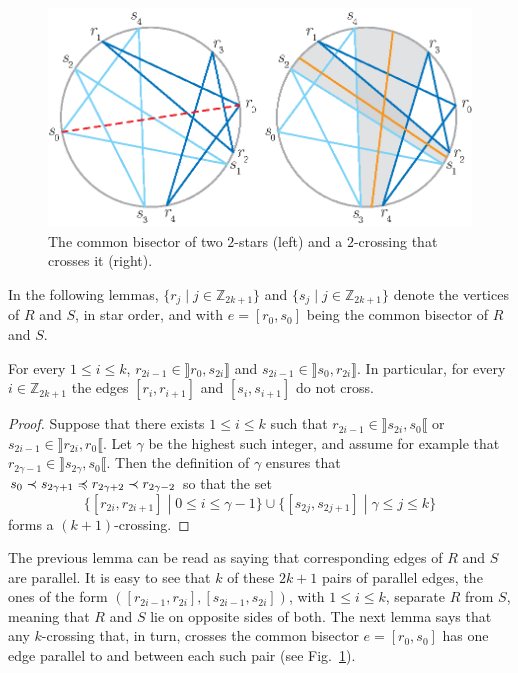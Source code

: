 \documentclass[12pt]{amsart}
\begin{document}
\begin{figure}
\centerline{\includegraphics[scale=1]{combisector.eps}}
\caption{\small{The common bisector of two $2$-stars (left) and a $2$-crossing that crosses it (right).}}\label{combisector}
\end{figure}

In the following lemmas, $\{r_j\;|\; j\in\mathbb{Z}_{2k+1}\}$ and $\{s_j\;|\; j\in\mathbb{Z}_{2k+1}\}$ denote the vertices of $R$ and $S$, in star order, and with $e=[r_0,s_0]$ being the common bisector of $R$ and $S$.

\begin{lemma}\label{paralleledges}
For every $1\le i\le k$, $r_{2i-1}\in\rrbracket r_0,s_{2i}\rrbracket$ and $s_{2i-1}\in\rrbracket s_0,r_{2i}\rrbracket$.
In particular, for every $i\in\mathbb{Z}_{2k+1}$ the edges $[r_i,r_{i+1}]$ and $[s_i,s_{i+1}]$ do not cross.
\end{lemma}

\begin{proof}
Suppose that there exists $1\le i\le k$ such that $r_{2i-1}\in\rrbracket s_{2i},s_0\llbracket$ or $s_{2i-1}\in\rrbracket r_{2i},r_0\llbracket$. Let $\gamma$ be the highest such integer, and assume for example that $r_{2\gamma-1}\in\rrbracket s_{2\gamma},s_0\llbracket$. Then the definition of $\gamma$ ensures that
$s_0\prec s_{2\gamma+1}\preccurlyeq r_{2\gamma+2}\prec r_{2\gamma-2}$
so that the set
$$\{[r_{2i},r_{2i+1}]\;|\; 0\le i\le\gamma-1\}\cup\{[s_{2j},s_{2j+1}]\;|\; \gamma\le j\le k\}$$
forms a $(k+1)$-crossing.
\end{proof}

The previous lemma can be read as saying that corresponding edges of $R$ and $S$ are parallel. It is easy to see that $k$ of these $2k+1$ pairs of parallel edges, the ones of the form $([r_{2i-1},r_{2i}],[s_{2i-1},s_{2i}])$, with $1\le i\le k$, separate $R$ from $S$, meaning that $R$ and $S$ lie on opposite sides of both. The next lemma says that any $k$-crossing that, in turn, crosses the common bisector $e=[r_0,s_0]$ has one edge parallel to and between each such pair (see Fig.~\ref{combisector}).
\end{document}
